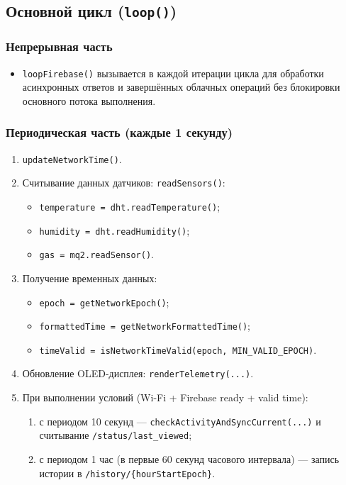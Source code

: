 \subsection{Основной цикл (\texttt{loop()})}

\subsubsection*{Непрерывная часть}

\begin{itemize}
    \item \texttt{loopFirebase()} вызывается в каждой итерации цикла для обработки асинхронных ответов и завершённых облачных операций без блокировки основного потока выполнения.
\end{itemize}

\subsubsection*{Периодическая часть (каждые 1 секунду)}

\begin{enumerate}
    \item \texttt{updateNetworkTime()}.
    \item Считывание данных датчиков: \texttt{readSensors()}:
    \begin{itemize}
        \item \texttt{temperature = dht.readTemperature()};
        \item \texttt{humidity = dht.readHumidity()};
        \item \texttt{gas = mq2.readSensor()}.
    \end{itemize}
    \item Получение временных данных:
    \begin{itemize}
        \item \texttt{epoch = getNetworkEpoch()};
        \item \texttt{formattedTime = getNetworkFormattedTime()};
        \item \texttt{timeValid = isNetworkTimeValid(epoch, MIN\_VALID\_EPOCH)}.
    \end{itemize}
    \item Обновление OLED-дисплея: \texttt{renderTelemetry(...)}.
    \item При выполнении условий (Wi-Fi + Firebase ready + valid time):
    \begin{enumerate}
        \item с периодом 10 секунд --- \texttt{checkActivityAndSyncCurrent(...)} и считывание \texttt{/status/last\_viewed};
        \item с периодом 1 час (в первые 60 секунд часового интервала) --- запись истории в \texttt{/history/\{hourStartEpoch\}}.
    \end{enumerate}
\end{enumerate}

